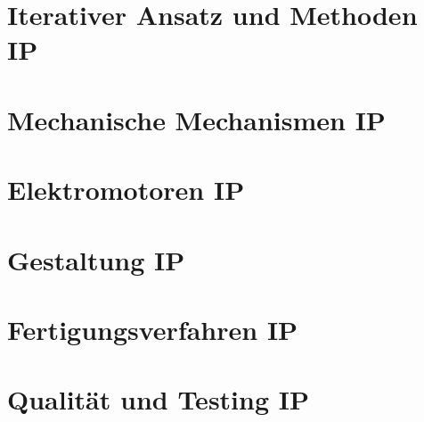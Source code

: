 \documentclass[numerate]{cheatsheet}
\begin{document}
\section{Iterativer Ansatz und Methoden \hfill IP}
    
    
    
    
    
    \cbreak
    
    
    
    

\section{Mechanische Mechanismen \hfill IP}
    
    
    
    
    
    \cbreak
    
    
    

\section{Elektromotoren \hfill IP}
    
    
    
    

\section{Gestaltung \hfill IP}
    
    
    

\section{Fertigungsverfahren \hfill IP}
    
    
    
    \cbreak
    

\section{Qualität und Testing \hfill IP}
    
    
    
    
    
    \cbreak
\end{document}
